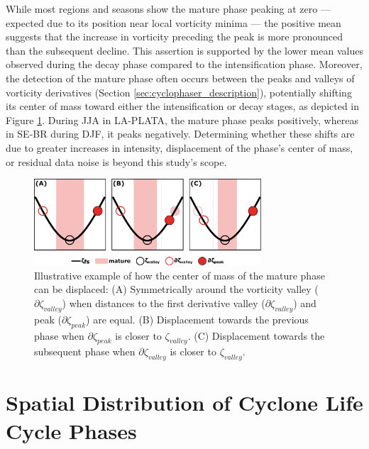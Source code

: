 While most regions and seasons show the mature phase peaking at zero — expected due to its position near local vorticity minima — the positive mean suggests that the increase in vorticity preceding the peak is more pronounced than the subsequent decline. This assertion is supported by the lower mean values observed during the decay phase compared to the intensification phase. Moreover, the detection of the mature phase often occurs between the peaks and valleys of vorticity derivatives (Section \ref{sec:cyclophaser_description}), potentially shifting its center of mass toward either the intensification or decay stages, as depicted in Figure \ref{fig:mature_phase}. During JJA in LA-PLATA, the mature phase peaks positively, whereas in SE-BR during DJF, it peaks negatively. Determining whether these shifts are due to greater increases in intensity, displacement of the phase's center of mass, or residual data noise is beyond this study's scope.

\begin{figure}[!htbp]
\centering
\includegraphics[width=20pc]{figs_4/mature_phase.pdf}
\caption[Mature Phase - Center of Mass]{Illustrative example of how the center of mass of the mature phase can be displaced: (A) Symmetrically around the vorticity valley (\(\partial \zeta_{valley}\)) when distances to the first derivative valley (\(\partial \zeta_{valley}\)) and peak (\(\partial \zeta_{peak}\)) are equal. (B) Displacement towards the previous phase when \(\partial \zeta_{peak}\) is closer to \(\zeta_{valley}\). (C) Displacement towards the subsequent phase when \(\partial \zeta_{valley}\) is closer to \(\zeta_{valley}\).}
\label{fig:mature_phase}
\end{figure}

\section{Spatial Distribution of Cyclone Life Cycle Phases}
\label{sec:spatial_distribution}

